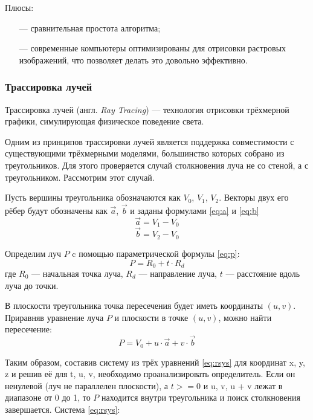 Плюсы:
\begin{itemize}[leftmargin=1.6\parindent]
	\item[---] сравнительная простота алгоритма;
	\item[---] современные компьютеры оптимизированы для отрисовки растровых 
	изображений, что позволяет делать это довольно эффективно.
\end{itemize}

\subsubsection{Трассировка лучей}
Трассировка лучей (англ. \textit{Ray Tracing}) \cite{raytracing} --- технология отрисовки 
трёхмерной графики, симулирующая физическое поведение света. 

Одним из принципов трассировки лучей является поддержка 
совместимости с существующими трёхмерными моделями, большинство 
которых собрано из треугольников.
Для этого проверяется случай столкновения 
луча не со стеной, а с треугольником.
Рассмотрим этот случай.

Пусть вершины треугольника обозначаются как $V_0$, $V_1$, $V_2$. 
Векторы  двух его рёбер будут обозначены как $\vec{a}$, $\vec{b}$ и заданы формулами \ref{eq:a} и \ref{eq:b}
\begin{equation}
	\vec{a} = V_1 - V_0
	\label{eq:a}
\end{equation}
\begin{equation}
	\vec{b} = V_2 - V_0
	\label{eq:b}
\end{equation}

Определим луч $P$ c помощью параметрической формулы \ref{eq:p}:
\begin{equation}
	P= R_0 + t \cdot R_d
	\label{eq:p}
\end{equation}
где $R_0$ --- начальная точка луча, $R_d$ --- направление луча, $t$ --- расстояние вдоль луча до точки.

В плоскости треугольника точка пересечения будет иметь координаты $(u, v)$. Приравняв уравнение луча $P$ и плоскости в точке $(u, v)$, можно найти пересечение:
\begin{equation}
	P= V_0 + u \cdot \vec{a} + v \cdot \vec{b}
	\label{eq:p2}
\end{equation}

Таким образом, составив систему из трёх уравнений \ref{eq:rsys} для координат x, y, z и решив её для t, u, v, необходимо проанализировать определитель. Если 
он ненулевой (луч не параллелен плоскости), а $ t >= 0$ и u, v, u + v лежат в диапазоне от 0 до 1, то $P$ находится внутри треугольника и поиск столкновения завершается. Система \ref{eq:rsys}:

